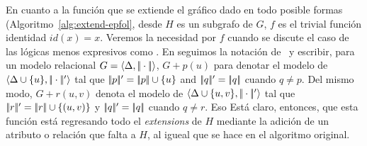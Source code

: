 {\begin{center}
\begin{minipage}[t]{5.2cm}
\begin{algorithm}[H]
 \;
\end{algorithm}
\end{minipage}
\end{center}
%


En cuanto a la función que se extiende el gráfico dado en todo posible
formas (Algoritmo~\ref{alg:extend-epfol}, desde $ H $
  es un subgrafo de $G$, $f$ es el
trivial función identidad $\mathit{id(x)} = x$. Veremos la necesidad
por $ f $ cuando se discute el caso de las lógicas menos expresivos como \EL.
En  seguimos la notación
de~\cite{Krahmer2003} y escribir, para un modelo relacional
$G = \langle \Delta,
|\!|\cdot|\!| \rangle$,  $G + p(u)$ para denotar el modelo de $\langle \Delta
\cup \{u\},|\!|\cdot|\!|' \rangle$ tal que $|\!|p|\!|' = |\!|p|\!|
\cup \{u\}$ and $|\!|q|\!|' = |\!|q|\!|$ cuando  $q \neq p$.
Del mismo modo, $G + r(u,v)$ denota el modelo de $\langle \Delta \cup
\{u,v\},|\!|\cdot|\!|' \rangle$ tal que $|\!|r|\!|' = |\!|r|\!|
\cup \{(u,v)\}$ y $|\!|q|\!|' = |\!|q|\!|$ cuando $q \neq r$. Eso
Está claro, entonces, que esta función está regresando todo el
\emph{extensions} de $H$ mediante la adición de un atributo o relación que falta
a $H$, al igueal que se hace en el algoritmo original.

}
